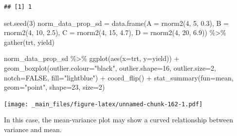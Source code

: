 \documentclass[
]{book}
\newenvironment{Shaded}{\begin{snugshade}}{\end{snugshade}}
\newcommand{\AttributeTok}[1]{\textcolor[rgb]{0.77,0.63,0.00}{#1}}
\newcommand{\ConstantTok}[1]{\textcolor[rgb]{0.00,0.00,0.00}{#1}}
\newcommand{\DecValTok}[1]{\textcolor[rgb]{0.00,0.00,0.81}{#1}}
\newcommand{\FloatTok}[1]{\textcolor[rgb]{0.00,0.00,0.81}{#1}}
\newcommand{\FunctionTok}[1]{\textcolor[rgb]{0.00,0.00,0.00}{#1}}
\newcommand{\NormalTok}[1]{#1}
\newcommand{\OtherTok}[1]{\textcolor[rgb]{0.56,0.35,0.01}{#1}}
\newcommand{\SpecialCharTok}[1]{\textcolor[rgb]{0.00,0.00,0.00}{#1}}
\newcommand{\StringTok}[1]{\textcolor[rgb]{0.31,0.60,0.02}{#1}}
\begin{document}
\begin{verbatim}
## [1] 1
\end{verbatim}

\begin{Shaded}
\begin{Highlighting}[]
\FunctionTok{set.seed}\NormalTok{(}\DecValTok{3}\NormalTok{)}
\NormalTok{norm\_data\_prop\_sd }\OtherTok{=} \FunctionTok{data.frame}\NormalTok{(}\AttributeTok{A =} \FunctionTok{rnorm2}\NormalTok{(}\DecValTok{4}\NormalTok{, }\DecValTok{5}\NormalTok{, }\FloatTok{0.3}\NormalTok{),}
                                \AttributeTok{B =} \FunctionTok{rnorm2}\NormalTok{(}\DecValTok{4}\NormalTok{, }\DecValTok{10}\NormalTok{, }\FloatTok{2.5}\NormalTok{),}
                                \AttributeTok{C =} \FunctionTok{rnorm2}\NormalTok{(}\DecValTok{4}\NormalTok{, }\DecValTok{15}\NormalTok{, }\FloatTok{4.7}\NormalTok{),}
                                \AttributeTok{D =} \FunctionTok{rnorm2}\NormalTok{(}\DecValTok{4}\NormalTok{, }\DecValTok{20}\NormalTok{, }\FloatTok{6.9}\NormalTok{)) }\SpecialCharTok{\%\textgreater{}\%}
  \FunctionTok{gather}\NormalTok{(trt, yield)}

\NormalTok{norm\_data\_prop\_sd }\SpecialCharTok{\%\textgreater{}\%}
        \FunctionTok{ggplot}\NormalTok{(}\FunctionTok{aes}\NormalTok{(}\AttributeTok{x=}\NormalTok{trt, }\AttributeTok{y=}\NormalTok{yield)) }\SpecialCharTok{+} 
        \FunctionTok{geom\_boxplot}\NormalTok{(}\AttributeTok{outlier.colour=}\StringTok{"black"}\NormalTok{, }\AttributeTok{outlier.shape=}\DecValTok{16}\NormalTok{,}
             \AttributeTok{outlier.size=}\DecValTok{2}\NormalTok{, }\AttributeTok{notch=}\ConstantTok{FALSE}\NormalTok{, }\AttributeTok{fill=}\StringTok{"lightblue"}\NormalTok{) }\SpecialCharTok{+}
        \FunctionTok{coord\_flip}\NormalTok{() }\SpecialCharTok{+}
        \FunctionTok{stat\_summary}\NormalTok{(}\AttributeTok{fun=}\NormalTok{mean, }\AttributeTok{geom=}\StringTok{"point"}\NormalTok{, }\AttributeTok{shape=}\DecValTok{23}\NormalTok{, }\AttributeTok{size=}\DecValTok{2}\NormalTok{)}
\end{Highlighting}
\end{Shaded}

\texttt{[image: \_main\_files/figure-latex/unnamed-chunk-162-1.pdf]}

In this case, the mean-variance plot may show a curved relationship between variance and mean.
\end{document}
